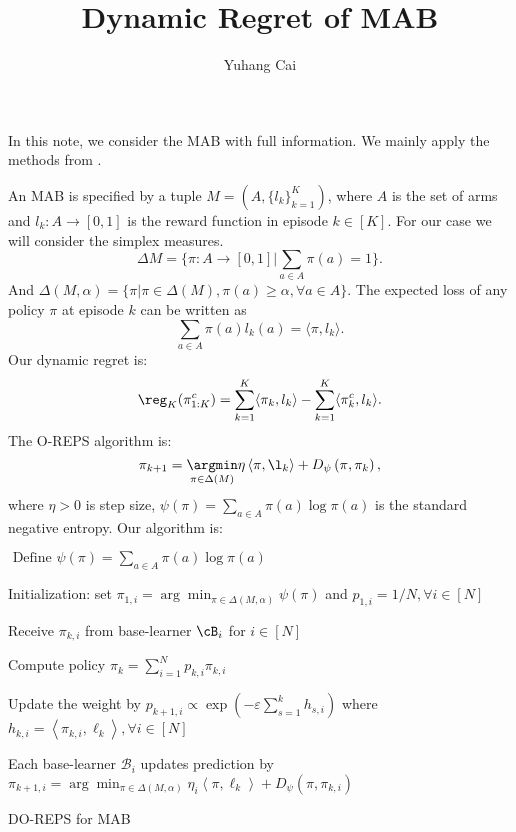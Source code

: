\documentclass[11pt]{article}
\begin{document}
	\title{Dynamic Regret of MAB}%
  \author{Yuhang Cai} 
	\maketitle

In this note, we consider the MAB with full information. We mainly apply the methods from \citep{zhao2022dynamic}.  

An MAB is specified by a tuple $M = (A,\{l_k\}_{k=1}^K )$, where $A$ is the set of arms and $l_k:A\to [0,1]$ is the reward function in episode $k\in [K]$. For our case we will consider the simplex measures. 
\[
    \Delta M = \{\pi:A\to [0,1]| \sum_{a\in A}\pi(a) =1\}.  
\]
And $\Delta(M,\alpha) = \{\pi| \pi\in \Delta(M), \pi(a) \ge \alpha, \forall a\in A\} $. 
The expected loss of any policy $\pi$ at episode $k$ can be written as 
\[
    \sum_{a\in A} \pi(a) l_k(a) = \langle \pi, l_k \rangle.   
\]
Our dynamic regret is: 
\[
    \reg_K (\pi^c_{1:K}) = \sum_{k=1}^K \langle \pi_k, l_k \rangle - \sum_{k=1}^K \langle \pi_k^c, l_k \rangle . 
\]
The O-REPS algorithm is: 
$$
\pi_{k+1}=\underset{\pi \in \Delta(M)}{\argmin } \eta\left\langle \pi, \l_k\right\rangle+D_\psi\left(\pi, \pi_k\right),
$$
where $\eta>0$ is step size, $\psi(\pi)=\sum_{a\in A} \pi(a) \log \pi( a)$ is the standard negative entropy.
Our algorithm is: 
\begin{algorithm}[!ht]
\DontPrintSemicolon
{}
$\text { Define } \psi(\pi)=\sum_{a\in A} \pi(a) \log \pi(a)$ 

Initialization: set $\pi_{1, i}=\arg \min _{\pi \in \Delta(M, \alpha)} \psi(\pi)$ and $p_{1, i}=1 / N, \forall i \in[N]$

{
    Receive $\pi_{k,i}$ from base-learner $\cB_i$ for $i\in [N]$

    Compute policy $\pi_k = \sum_{i=1}^N p_{k,i}\pi_{k,i}$ 

    Update the weight by $p_{k+1, i} \propto \exp \left(-\varepsilon \sum_{s=1}^k h_{s, i}\right)$ where $h_{k, i}=\left\langle \pi_{k,i}, \ell_k\right\rangle, \forall i \in[N]$

    Each base-learner $\mathcal{B}_i$ updates prediction by $\pi_{k+1, i}=\arg \min _{\pi \in \Delta(M, \alpha)} \eta_i\left\langle \pi, \ell_k\right\rangle+D_\psi\left(\pi, \pi_{k, i}\right)$
}
\caption{DO-REPS for MAB}
\end{algorithm}
\end{document}
